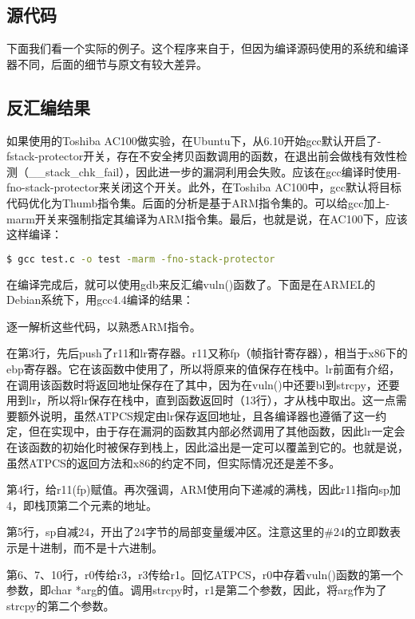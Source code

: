 \subsection{源代码}
下面我们看一个实际的例子。这个程序来自于\cite{arm_exploiting_linux}，但因为编译源码使用的系统和编译器不同，后面的细节与原文有较大差异。


\subsection{反汇编结果}
如果使用的Toshiba AC100做实验，在Ubuntu下，从6.10开始gcc默认开启了-fstack-protector开关，存在不安全拷贝函数调用的函数，在退出前会做栈有效性检测（\_\_stack\_chk\_fail），因此进一步的漏洞利用会失败。应该在gcc编译时使用-fno-stack-protector来关闭这个开关。此外，在Toshiba AC100中，gcc默认将目标代码优化为Thumb指令集。后面的分析是基于ARM指令集的。可以给gcc加上-marm开关来强制指定其编译为ARM指令集。最后，也就是说，在AC100下，应该这样编译：

\begin{lstlisting}[language=bash, numbers=none]
  $ gcc test.c -o test -marm -fno-stack-protector
\end{lstlisting}

在编译完成后，就可以使用gdb来反汇编vuln()函数了。下面是在ARMEL的Debian系统下，用gcc4.4编译的结果：



逐一解析这些代码，以熟悉ARM指令。

在第3行，先后push了r11和lr寄存器。r11又称fp（帧指针寄存器），相当于x86下的ebp寄存器。它在该函数中使用了，所以将原来的值保存在栈中。lr前面有介绍，在调用该函数时将返回地址保存在了其中，因为在vuln()中还要bl到strcpy，还要用到lr，所以将lr保存在栈中，直到函数返回时（13行），才从栈中取出。这一点需要额外说明，虽然ATPCS规定由lr保存返回地址，且各编译器也遵循了这一约定，但在实现中，由于存在漏洞的函数其内部必然调用了其他函数，因此lr一定会在该函数的初始化时被保存到栈上，因此溢出是一定可以覆盖到它的。也就是说，虽然ATPCS的返回方法和x86的约定不同，但实际情况还是差不多。

第4行，给r11(fp)赋值。再次强调，ARM使用向下递减的满栈，因此r11指向sp加4，即栈顶第二个元素的地址。

第5行，sp自减24，开出了24字节的局部变量缓冲区。注意这里的\#24的立即数表示是十进制，而不是十六进制。

第6、7、10行，r0传给r3，r3传给r1。回忆ATPCS，r0中存着vuln()函数的第一个参数，即char *arg的值。调用strcpy时，r1是第二个参数，因此，将arg作为了strcpy的第二个参数。

